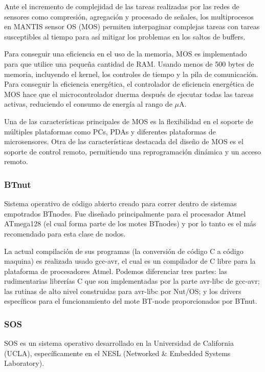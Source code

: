 Ante el incremento de complejidad de las tareas realizadas por las redes de sensores como compresión, agregación y procesado de señales, los multiprocesos en MANTIS sensor OS (MOS) permiten interpaginar complejas tareas con tareas susceptibles al tiempo para así mitigar los problemas en los saltos de buffers.




Para conseguir una eficiencia en el uso de la memoria, MOS es implementado para que utilice una pequeña cantidad de RAM. Usando menos de 500 bytes de memoria, incluyendo el kernel, los controles de tiempo y la pila de comunicación. Para conseguir la eficiencia energética, el controlador de eficiencia energética de MOS hace que el microcontrolador duerma después de ejecutar todas las tareas activas, reduciendo el consumo de energía al rango de \(\mu\)A.



Una de las características principales de MOS es la flexibilidad en el soporte de múltiples plataformas como PCs, PDAs y diferentes plataformas de microsensores. Otra de las características destacada del diseño de MOS es el soporte de control remoto, permitiendo una reprogramación dinámica y un acceso remoto.



\subsubsection{BTnut}
Sistema operativo de código abierto creado para correr dentro de sistemas empotrados BTnodes. Fue diseñado principalmente para el procesador Atmel ATmega128 (el cual forma parte de los motes BTnodes) y por lo tanto es el más recomendado para esta clase de nodos.



La actual compilación de sus programas (la conversión de código C a código maquina) es realizada usado gcc-avr, el cual es un compilador de C libre para la plataforma de procesadores Atmel. Podemos diferenciar tres partes: las rudimentarias librerías C que son implementadas por la parte avr-libc de gcc-avr; las rutinas de alto nivel construidas para avr-libc por Nut/OS; y los drivers específicos para el funcionamiento del mote BT-node proporcionados por BTnut.



\subsubsection{SOS}
SOS es un sistema operativo desarrollado en la Universidad de California (UCLA), específicamente en el NESL (Networked \& Embedded Systems Laboratory).



